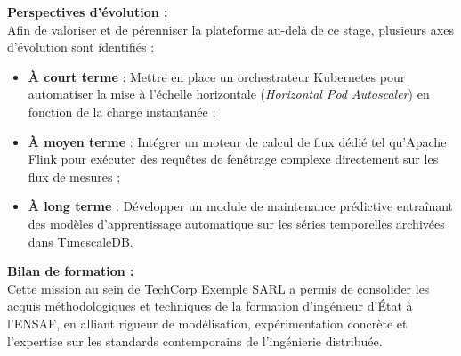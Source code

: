 \vspace{0.4cm}

\noindent
\textbf{Perspectives d'\'evolution :}\\
Afin de valoriser et de p\'erenniser la plateforme au-del\`a de ce stage, plusieurs axes d'\'evolution sont identifi\'es :
\begin{itemize}
    \item \textbf{\`A court terme} : Mettre en place un orchestrateur Kubernetes pour automatiser la mise \`a l'\'echelle horizontale (\textit{Horizontal Pod Autoscaler}) en fonction de la charge instantan\'ee ;
    \item \textbf{\`A moyen terme} : Int\'egrer un moteur de calcul de flux d\'edi\'e tel qu'Apache Flink pour ex\'ecuter des requ\^etes de fen\^etrage complexe directement sur les flux de mesures ;
    \item \textbf{\`A long terme} : D\'evelopper un module de maintenance pr\'edictive entra\^inant des mod\`eles d'apprentissage automatique sur les s\'eries temporelles archiv\'ees dans TimescaleDB.
\end{itemize}

\vspace{0.4cm}

\noindent
\textbf{Bilan de formation :}\\
Cette mission au sein de TechCorp Exemple SARL a permis de consolider les acquis m\'ethodologiques et techniques de la formation d'ing\'enieur d'\'Etat \`a l'ENSAF, en alliant rigueur de mod\'elisation, exp\'erimentation concr\`ete et l'expertise sur les standards contemporains de l'ing\'enierie distribu\'ee.
